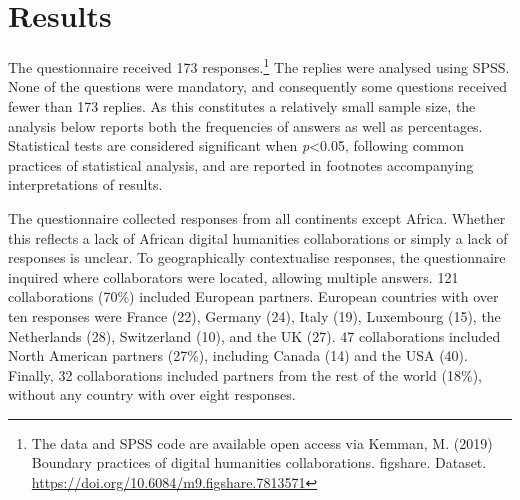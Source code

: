 \documentclass{article}
\begin{document}
\section{Results} 
The questionnaire received 173 responses.\footnote{The data and SPSS code are available open access via Kemman, M. (2019) Boundary practices of digital humanities collaborations. figshare. Dataset. \url{https://doi.org/10.6084/m9.figshare.7813571}}
The replies were analysed using SPSS.
None of the questions were mandatory, and consequently some questions received fewer than 173 replies. 
As this constitutes a relatively small sample size, the analysis below reports both the frequencies of answers as well as percentages.
Statistical tests are considered significant when \textit{p}\textless0.05, following common practices of statistical analysis, and are reported in footnotes accompanying interpretations of results.

The questionnaire collected responses from all continents except Africa. 
Whether this reflects a lack of African digital humanities collaborations or simply a lack of responses is unclear.
To geographically contextualise responses, the questionnaire inquired where collaborators were located, allowing multiple answers. 
121 collaborations (70\%) included European partners. European countries with over ten responses were France (22), Germany (24), Italy (19), Luxembourg (15), the Netherlands (28), Switzerland (10), and the UK (27).
47 collaborations included North American partners (27\%), including Canada (14) and the USA (40).
Finally, 32 collaborations included partners from the rest of the world (18\%), without any country with over eight responses.
\end{document}

